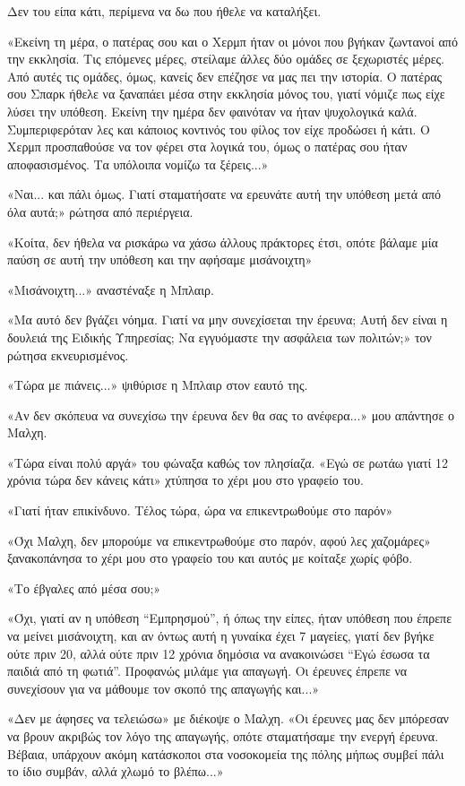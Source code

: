 \documentclass[12pt,twoside, openany]{book}
\begin{document}
Δεν του είπα κάτι, περίμενα να δω που ήθελε να καταλήξει.

«Εκείνη τη μέρα, ο πατέρας σου και ο Χερμπ ήταν οι μόνοι που βγήκαν ζωντανοί από την εκκλησία. Τις επόμενες μέρες, στείλαμε άλλες δύο ομάδες σε ξεχωριστές μέρες. Από αυτές τις ομάδες, όμως, κανείς δεν επέζησε να μας πει την ιστορία. Ο πατέρας σου Σπαρκ ήθελε να ξαναπάει μέσα στην εκκλησία μόνος του, γιατί νόμιζε πως είχε λύσει την υπόθεση. Εκείνη την ημέρα δεν φαινόταν να ήταν ψυχολογικά καλά. Συμπεριφερόταν λες και κάποιος κοντινός του φίλος τον είχε προδώσει ή κάτι. Ο Χερμπ προσπαθούσε να τον φέρει στα λογικά του, όμως ο πατέρας σου ήταν αποφασισμένος. Τα υπόλοιπα νομίζω τα ξέρεις...»

«Ναι... και πάλι όμως. Γιατί σταματήσατε να ερευνάτε αυτή την υπόθεση μετά από όλα αυτά;» ρώτησα από περιέργεια.

«Κοίτα, δεν ήθελα να ρισκάρω να χάσω άλλους πράκτορες έτσι, οπότε βάλαμε μία παύση σε αυτή την υπόθεση και την αφήσαμε μισάνοιχτη»

«Μισάνοιχτη...» αναστέναξε η Μπλαιρ.

«Μα αυτό δεν βγάζει νόημα. Γιατί να μην συνεχίσεται την έρευνα; Αυτή δεν είναι η δουλειά της Ειδικής Υπηρεσίας; Να εγγυόμαστε την ασφάλεια των πολιτών;» τον ρώτησα εκνευρισμένος.

«Τώρα με πιάνεις...» ψιθύρισε η Μπλαιρ στον εαυτό της.

«Αν δεν σκόπευα να συνεχίσω την έρευνα δεν θα σας το ανέφερα...» μου απάντησε ο Μαλχη.

«Τώρα είναι πολύ αργά» του φώναξα καθώς τον πλησίαζα. «Εγώ σε ρωτάω γιατί 12 χρόνια τώρα δεν κάνεις κάτι» χτύπησα το χέρι μου στο γραφείο του.

«Γιατί ήταν επικίνδυνο. Τέλος τώρα, ώρα να επικεντρωθούμε στο παρόν»

«Όχι Μαλχη, δεν μπορούμε να επικεντρωθούμε στο παρόν, αφού λες χαζομάρες» ξανακοπάνησα το χέρι μου στο γραφείο του και αυτός με κοίταξε χωρίς φόβο.

«Το έβγαλες από μέσα σου;»

«Όχι, γιατί αν η υπόθεση “Εμπρησμού”, ή όπως την είπες, ήταν υπόθεση που έπρεπε να μείνει μισάνοιχτη, και αν όντως αυτή η γυναίκα έχει 7 μαγείες, γιατί δεν βγήκε ούτε πριν 20, αλλά ούτε πριν 12 χρόνια δημόσια να ανακοινώσει “Εγώ έσωσα τα παιδιά από τη φωτιά”. Προφανώς μιλάμε για απαγωγή. Οι έρευνες έπρεπε να συνεχίσουν για να μάθουμε τον σκοπό της απαγωγής και...»

«Δεν με άφησες να τελειώσω» με διέκοψε ο Μαλχη. «Οι έρευνες μας δεν μπόρεσαν να βρουν ακριβώς τον λόγο της απαγωγής, οπότε σταματήσαμε την ενεργή έρευνα. Βέβαια, υπάρχουν ακόμη κατάσκοποι στα νοσοκομεία της πόλης μήπως συμβεί πάλι το ίδιο συμβάν, αλλά χλωμό το βλέπω...»
\end{document}
